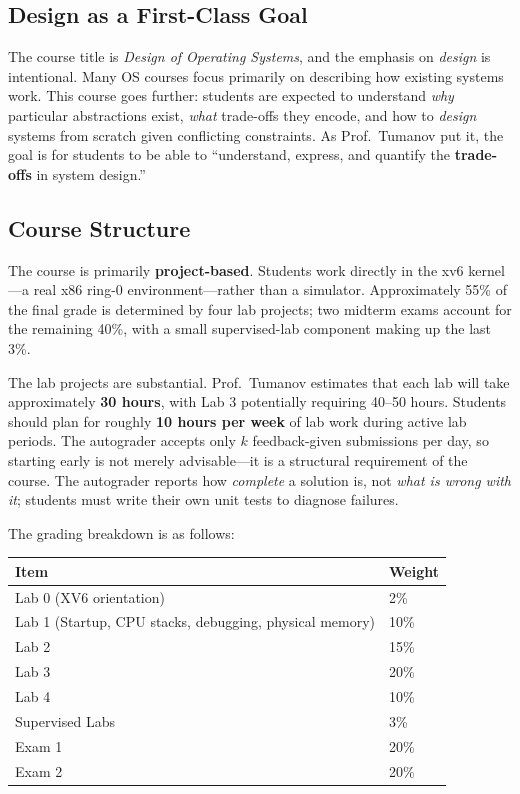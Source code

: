 \documentclass[11pt]{article}
\begin{document}
\subsection{Design as a First-Class Goal}

The course title is \emph{Design of Operating Systems}, and the emphasis on \emph{design} is
intentional. Many OS courses focus primarily on describing how existing systems work. This course
goes further: students are expected to understand \emph{why} particular abstractions exist,
\emph{what} trade-offs they encode, and how to \emph{design} systems from scratch given
conflicting constraints. As Prof.\ Tumanov put it, the goal is for students to be able to
``understand, express, and quantify the \textbf{trade-offs} in system design.''

\subsection{Course Structure}

The course is primarily \textbf{project-based}. Students work directly in the xv6 kernel---a real
x86 ring-0 environment---rather than a simulator. Approximately 55\% of the final grade is
determined by four lab projects; two midterm exams account for the remaining 40\%, with a small
supervised-lab component making up the last 3\%.

The lab projects are substantial. Prof.\ Tumanov estimates that each lab will take approximately
\textbf{30 hours}, with Lab 3 potentially requiring 40--50 hours. Students should plan for
roughly \textbf{10 hours per week} of lab work during active lab periods. The autograder accepts
only $k$ feedback-given submissions per day, so starting early is not merely advisable---it is a
structural requirement of the course. The autograder reports how \emph{complete} a solution is,
not \emph{what is wrong with it}; students must write their own unit tests to diagnose failures.

The grading breakdown is as follows:

\begin{center}
\begin{tabular}{ll}
\toprule
\textbf{Item} & \textbf{Weight} \\
\midrule
Lab 0 (XV6 orientation) & 2\% \\
Lab 1 (Startup, CPU stacks, debugging, physical memory) & 10\% \\
Lab 2 & 15\% \\
Lab 3 & 20\% \\
Lab 4 & 10\% \\
Supervised Labs & 3\% \\
Exam 1 & 20\% \\
Exam 2 & 20\% \\
\bottomrule
\end{tabular}
\end{center}
\end{document}
